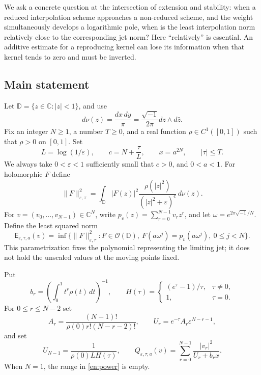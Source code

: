 \documentclass[12pt]{amsart}
\theoremstyle{definition}
\theoremstyle{remark}
\numberwithin{equation}{section}
\newcommand{\cO}{\mathcal{O}}
\newcommand{\C}{\mathbb{C}}
\newcommand{\D}{\mathbb{D}}
\newcommand{\Cost}{\mathsf E}
\theoremstyle{definition}
\begin{document}
We ask a concrete question at the intersection of extension and stability:
when a reduced interpolation scheme approaches a non-reduced scheme,
and the weight simultaneously develops a logarithmic pole, when is the
least interpolation norm relatively close to the corresponding jet norm?
Here ``relatively'' is essential. An additive estimate for a reproducing
kernel can lose its information when that kernel tends to zero and must
be inverted.

\subsection{Main statement}
Let $\D=\{z\in\C:|z|<1\}$, and use
\begin{equation}\label{en:area}
 d\nu(z)=\frac{dx\,dy}{\pi}=\frac{\sqrt{-1}}{2\pi}dz\wedge d\bar z.
\end{equation}
Fix an integer $N\ge1$, a number $T\ge0$, and a real function
$\rho\in C^1([0,1])$ such that $\rho>0$ on $[0,1]$. Set
\begin{equation}\label{en:parameters}
 L=\log(1/\varepsilon),\qquad
 c=N+\frac{\tau}{L},\qquad x=a^{2N},\qquad |\tau|\le T.
\end{equation}
We always take $0<\varepsilon<1$ sufficiently small that $c>0$, and
$0<a<1$. For holomorphic $F$ define
\begin{equation}\label{en:norm}
 \|F\|_{\varepsilon,\tau}^2
 =\int_\D |F(z)|^2\frac{\rho(|z|^2)}{(|z|^2+\varepsilon)^c}\,d\nu(z).
\end{equation}
For $v=(v_0,\ldots,v_{N-1})\in\C^N$, write
$p_v(z)=\sum_{r=0}^{N-1}v_rz^r$, and let $\omega=e^{2\pi\sqrt{-1}/N}$.
Define the least squared norm
\begin{equation}\label{en:cost}
 \Cost_{\varepsilon,\tau,a}(v)
 =\inf\{\|F\|_{\varepsilon,\tau}^2:
 F\in\cO(\D),\ F(a\omega^j)=p_v(a\omega^j),\ 0\le j<N\}.
\end{equation}
This parametrization fixes the polynomial representing the limiting jet;
it does not hold the unscaled values at the moving points fixed.

Put
\begin{equation}\label{en:constants}
 b_r=\left(\int_0^1t^r\rho(t)\,dt\right)^{-1},\qquad
 H(\tau)=\begin{cases}(e^\tau-1)/\tau,&\tau\ne0,\\1,&\tau=0.\end{cases}
\end{equation}
For $0\le r\le N-2$ set
\begin{equation}\label{en:power}
 A_r=\frac{(N-1)!}{\rho(0)r!(N-r-2)!},\qquad
 U_r=e^{-\tau}A_r\varepsilon^{N-r-1},
\end{equation}
and set
\begin{equation}\label{en:critical}
 U_{N-1}=\frac{1}{\rho(0)LH(\tau)},\qquad
 Q_{\varepsilon,\tau,a}(v)=\sum_{r=0}^{N-1}\frac{|v_r|^2}{U_r+b_rx}.
\end{equation}
When $N=1$, the range in \eqref{en:power} is empty.
\end{document}
